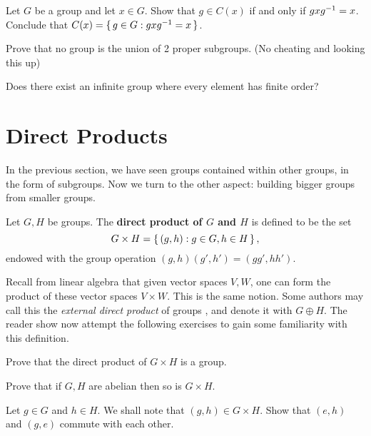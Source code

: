 \documentclass[./main.tex]{subfiles}
\begin{document}
\begin{exercise}
\label{exercise:conjugates-centralizer-relation}
    Let $G$ be a group and let $x \in G$. Show that $g \in C(x)$ if and only if
    $gxg^{-1} = x$. Conclude that $C(x) = \set{g \in G: gxg^{-1}= x}$.
\end{exercise}


\begin{prob}
    Prove that no group is the union of 2 proper subgroups. (No cheating and
    looking this up)
\end{prob}

\begin{prob}
    Does there exist an infinite group where every element has finite order?
\end{prob}

\section{Direct Products}

In the previous section, we have seen groups contained within other groups, in
the form of subgroups. Now we turn to the other aspect: building bigger groups
from smaller groups. 

\begin{definition}
\label{def:direct-product}
    Let $G, H$ be groups. The \textbf{direct product of $G$ and $H$} is defined to be 
    the set 
    \[
        G \times H = \set{(g,h) : g \in G, h \in H},
    \]
    endowed with the group operation $(g,h)(g',h') = (gg', hh')$.
\end{definition}
Recall from linear algebra that given vector spaces $V, W$, one can form the
product of these vector spaces $V \times W$. This is the same notion. Some
authors may call this the \emph{external direct product} of groups
\autocite[Ch~8]{Gallian_2020}, and denote it with $G \oplus H$. The reader show
now attempt the following exercises to gain some familiarity with this
definition.

\begin{exercise}
    Prove that the direct product of $G \times H$ is a group.
\end{exercise}
\begin{exercise}
    Prove that if $G, H$ are abelian then so is $G \times H$.
\end{exercise}
\begin{exercise}
    Let $g \in G$ and $h \in H$. We shall note that $(g,h) \in G \times H$. Show
    that $(e, h)$ and $(g, e)$ commute with each other. 
\end{exercise}
\end{document}
